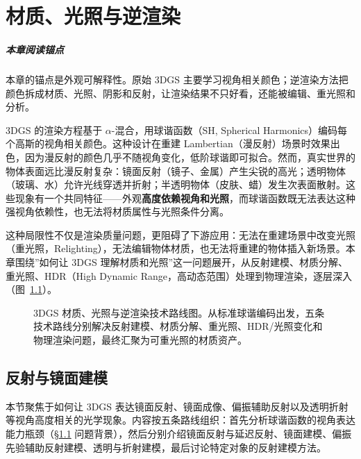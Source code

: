 \chapter{材质、光照与逆渲染}
\label{ch:05}

\paragraph*{本章阅读锚点}
本章的锚点是外观可解释性。原始 3DGS 主要学习视角相关颜色；逆渲染方法把颜色拆成材质、光照、阴影和反射，让渲染结果不只好看，还能被编辑、重光照和分析。


3DGS 的渲染方程基于 $\alpha$-混合，用球谐函数（SH, Spherical Harmonics）编码每个高斯的视角相关颜色。这种设计在重建 Lambertian（漫反射）场景时效果出色，因为漫反射的颜色几乎不随视角变化，低阶球谐即可拟合。然而，真实世界的物体表面远比漫反射复杂：镜面反射（镜子、金属）产生尖锐的高光；透明物体（玻璃、水）允许光线穿透并折射；半透明物体（皮肤、蜡）发生次表面散射。这些现象有一个共同特征——外观\textbf{高度依赖视角和光照}，而球谐函数既无法表达这种强视角依赖性，也无法将材质属性与光照条件分离。

这种局限性不仅是渲染质量问题，更阻碍了下游应用：无法在重建场景中改变光照（重光照，Relighting），无法编辑物体材质，也无法将重建的物体插入新场景。本章围绕”如何让 3DGS 理解材质和光照”这一问题展开，从反射建模、材质分解、重光照、HDR（High Dynamic Range，高动态范围）处理到物理渲染，逐层深入（图~\ref{fig:05_routes}）。

\begin{figure}[htbp]
  \centering
  \resizebox{0.95\textwidth}{!}{}
  \caption{3DGS 材质、光照与逆渲染技术路线图。从标准球谐编码出发，五条技术路线分别解决反射建模、材质分解、重光照、HDR/光照变化和物理渲染问题，最终汇聚为可重光照的材质资产。}
  \label{fig:05_routes}
\end{figure}

\section{反射与镜面建模}
\label{sec:05_1}

本节聚焦于如何让 3DGS 表达镜面反射、镜面成像、偏振辅助反射以及透明折射等视角高度相关的光学现象。内容按五条路线组织：首先分析球谐函数的视角表达能力瓶颈（\S\ref{sec:05_1} 问题背景），然后分别介绍镜面反射与延迟反射、镜面建模、偏振先验辅助反射建模、透明与折射建模，最后讨论特定对象的反射建模方法。

